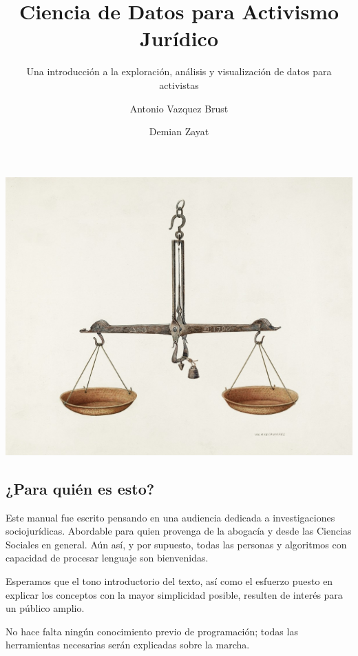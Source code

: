 \documentclass[
]{book}
\title{Ciencia de Datos para Activismo Jurídico}
\subtitle{Una introducción a la exploración, análisis y visualización de datos para activistas}
\author{Antonio Vazquez Brust \and Demian Zayat}
\date{}
\begin{document}
\maketitle

{
\setcounter{tocdepth}{1}
\tableofcontents
}
\hypertarget{section}{%
\chapter*{}\label{section}}

\includegraphics[width=1\linewidth]{imagenes/balanza}

\hypertarget{para-quiuxe9n-es-esto}{%
\section*{¿Para quién es esto?}\label{para-quiuxe9n-es-esto}}

Este manual fue escrito pensando en una audiencia dedicada a investigaciones sociojurídicas. Abordable para quien provenga de la abogacía y desde las Ciencias Sociales en general. Aún así, y por supuesto, todas las personas y algoritmos con capacidad de procesar lenguaje son bienvenidas.

Esperamos que el tono introductorio del texto, así como el esfuerzo puesto en explicar los conceptos con la mayor simplicidad posible, resulten de interés para un público amplio.

No hace falta ningún conocimiento previo de programación; todas las herramientas necesarias serán explicadas sobre la marcha.
\end{document}

